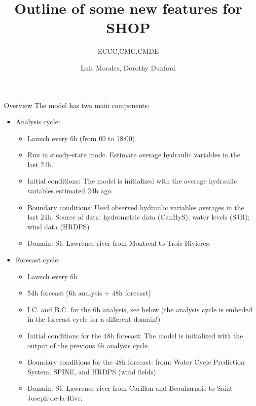 \documentclass{beamer}
\title{Outline of some new features for SHOP}
\subtitle{ECCC,CMC,CMDE}
\author{Luis Morales, Dorothy Dunford}
\begin{document}
	\frame {
		\titlepage
	}
\begin{frame}[allowframebreaks]{Overview}
The model has two main components:
\begin{itemize}
\item Analysis cycle:

\begin{itemize}
\item Launch every 6h (from 00 to 18:00)   
\item Run in steady-state mode. Estimate average hydraulic variables in the last 24h.
\item Initial conditions: The model is initialized with the average hydraulic variables estimated 24h ago.
\item Boundary conditions: Used observed hydraulic variables averages in the last 24h. Source of data: hydrometric data (CanHyS); water levels (SJR); wind data (HRDPS)
\item Domain: St. Lawrence river from Montreal to Trois-Rivieres.
\end{itemize}

\framebreak
\item Forecast cycle:

\begin{itemize}
\item Launch every 6h
\item 54h forecast (6h analysis + 48h forecast) 
\item I.C. and B.C. for the 6h analysis, see below (the analysis cycle is embeded in the forecast cycle for a different domain!)
\item Initial conditions for the 48h forecast: The model is initialized with the output of the previous 6h analysis cycle.
\item Boundary conditions for the 48h forecast: from: Water Cycle Prediction System, SPINE, and HRDPS (wind fields)
\item Domain: St. Lawrence river from Carillon and Beauharnois to Saint-Joseph-de-la-Rive.
\end{itemize}
\end{itemize}
\end{frame}
\end{document}
